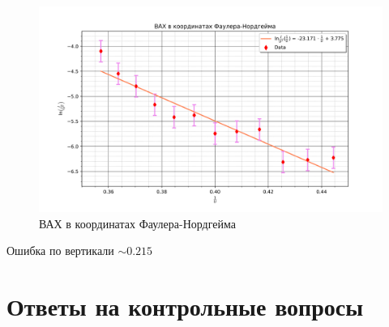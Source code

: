 \documentclass[a4paper]{article}
\begin{document}
\begin{enumerate}
	\begin{figure}[H]
		\begin{center}
		\includegraphics[scale = 0.6]{LN.png}
		\caption{ВАХ в координатах Фаулера-Нордгейма}
		\label{default}
		\end{center}
	\end{figure}

	Ошибка по вертикали $\sim 0.215$

\end{enumerate}

\section{Ответы на контрольные вопросы}
\end{document}
